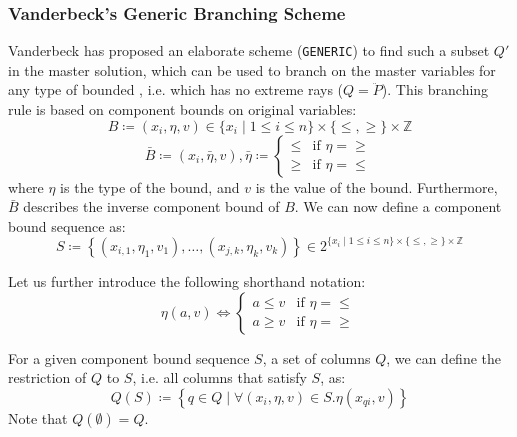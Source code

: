 \subsubsection{Vanderbeck's Generic Branching Scheme}\label{sec:cg_bp_bp_branching_generic}
Vanderbeck has proposed an elaborate scheme (\texttt{GENERIC}) to find such a subset $Q'$ in the master solution, which can be used to branch on the master variables for any type of bounded \IP{}, i.e. which has no extreme rays ($Q = \ddot{P}$). This branching rule is based on component bounds on original variables:
\begin{equation}
B \coloneqq \left( x_i, \eta, v \right) \in \{x_i \mid 1 \leq i \leq n\} \times \{\leq, \geq\} \times \mathbb{Z}
\end{equation}
\begin{equation}
\bar{B} \coloneqq \left( x_i, \bar{\eta}, v \right), \bar{\eta} \coloneqq \begin{cases} \leq & \text{if } \eta = \geq \\ \geq & \text{if } \eta = \leq \end{cases}
\end{equation}
where $\eta$ is the type of the bound, and $v$ is the value of the bound. Furthermore, $\bar{B}$ describes the inverse component bound of $B$. We can now define a component bound sequence as:
\begin{equation}
S \coloneqq \left\{ \left( x_{i,1}, \eta_1, v_1 \right), \dots, \left( x_{j,k}, \eta_k, v_k \right) \right\} \in 2^{\{x_i \mid 1 \leq i \leq n\} \times \{\leq, \geq\} \times \mathbb{Z}}
\end{equation}

Let us further introduce the following shorthand notation:
\begin{equation}
\eta(a, v) \Leftrightarrow
\begin{cases}
a \leq v & \text{if } \eta = \leq \\
a \geq v & \text{if } \eta = \geq
\end{cases}
\end{equation}

For a given component bound sequence $S$, a set of columns $Q$, we can define the restriction of $Q$ to $S$, i.e. all columns that satisfy $S$, as:
\begin{equation}
Q(S) \coloneqq \left\{ q \in Q \mid \forall \left( x_i, \eta, v \right) \in S. \eta(x_{qi}, v) \right\}
\end{equation}
Note that $Q(\emptyset) = Q$.

